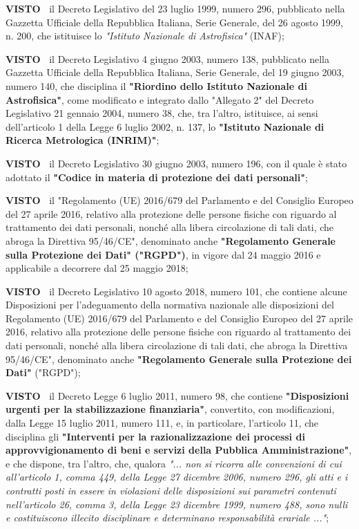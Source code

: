 \textbf{VISTO~}	il Decreto Legislativo del 23 luglio 1999, numero 296,
pubblicato nella Gazzetta Ufficiale della Repubblica Italiana, Serie
Generale, del 26 agosto 1999, n. 200, che istituisce lo \textit{"Istituto
Nazionale di Astrofisica"} (INAF);

\textbf{VISTO~}	il Decreto Legislativo 4 giugno 2003, numero 138,
pubblicato nella Gazzetta Ufficiale della Repubblica Italiana, Serie
Generale, del 19 giugno 2003, numero 140, che disciplina il \textbf{"Riordino
dello Istituto Nazionale di Astrofisica"}, come modificato e integrato
dallo "Allegato 2" del Decreto Legislativo 21 gennaio 2004, numero 38,
che, tra l'altro, istituisce, ai sensi dell'articolo 1 della Legge
6 luglio 2002, n. 137, lo \textbf{"Istituto Nazionale di Ricerca Metrologica
(INRIM)"};

\textbf{VISTO~}	il Decreto Legislativo 30 giugno 2003, numero 196, con
il quale è stato adottato il \textbf{"Codice in materia di protezione dei dati
personali"};

\textbf{VISTO~}	il "Regolamento (UE) 2016/679 del Parlamento e del
Consiglio Europeo del 27 aprile 2016, relativo alla protezione delle
persone fisiche con riguardo al trattamento dei dati personali, nonché
alla libera circolazione di tali dati, che abroga la Direttiva 95/46/CE",
denominato anche \textbf{"Regolamento Generale sulla Protezione dei Dati"
("RGPD")}, in vigore dal 24 maggio 2016 e applicabile a decorrere dal 25
maggio 2018;

\textbf{VISTO~}	il Decreto Legislativo 10 agosto 2018, numero 101,
che contiene alcune Disposizioni per l'adeguamento della normativa
nazionale alle disposizioni del Regolamento (UE) 2016/679 del Parlamento
e del Consiglio Europeo del 27 aprile 2016, relativo alla protezione
delle persone fisiche con riguardo al trattamento dei dati personali,
nonché alla libera circolazione di tali dati, che abroga la Direttiva
95/46/CE", denominato anche \textbf{"Regolamento Generale sulla Protezione dei
Dati"} ("RGPD");

\textbf{VISTO~}	il Decreto Legge 6 luglio 2011, numero 98, che contiene
\textbf{"Disposizioni urgenti per la stabilizzazione finanziaria"}, convertito,
con modificazioni, dalla Legge 15 luglio 2011, numero 111, e, in
particolare, l'articolo 11, che disciplina gli \textbf{"Interventi per la
razionalizzazione dei processi di approvvigionamento di beni e servizi
della Pubblica Amministrazione"}, e che dispone, tra l'altro, che,
qualora \textit{"... non si ricorra alle convenzioni di cui all'articolo
1, comma 449, della Legge 27 dicembre 2006, numero 296, gli atti e i
contratti posti in essere in violazioni delle disposizioni sui parametri
contenuti nell'articolo 26, comma 3, della Legge 23 dicembre 1999,
numero 488, sono nulli e costituiscono illecito disciplinare e determinano
responsabilità erariale ..."};


